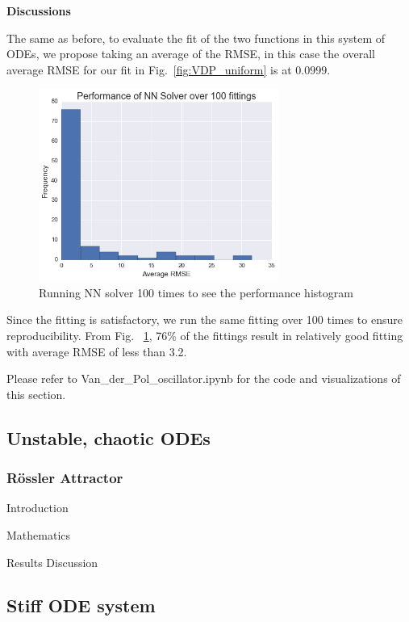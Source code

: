 \documentclass[11pt]{article}
\begin{document}
\textbf{Discussions}

The same as before, to evaluate the fit of the two functions in this system of ODEs, we propose taking an average of the RMSE, in this case the overall average RMSE for our fit in Fig.~\ref{fig:VDP_uniform} is at $0.0999$. 

\begin{figure}
\centering
\includegraphics[width=0.7\textwidth]{VDP_DIst.png}
      \caption{Running NN solver 100 times to see the performance histogram \label{fig:VDP_perf_dist}}
\end{figure}

Since the fitting is satisfactory, we run the same fitting over 100 times to ensure reproducibility. From Fig. ~\ref{fig:VDP_perf_dist}, 76\% of the fittings result in relatively good fitting with average RMSE of less than 3.2.

Please refer to Van\_der\_Pol\_oscillator.ipynb for the code and visualizations of this section.

\subsection{Unstable, chaotic ODEs}

\subsubsection{Rössler Attractor}

Introduction

Mathematics

Results Discussion



\subsection{Stiff ODE system}
\end{document}
